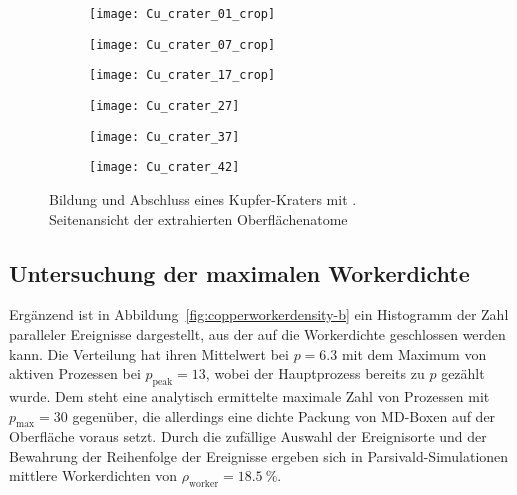 \begin{figure}

  \captionsetup[subfigure]{justification=centering,singlelinecheck=false}
  \def\subfigwidth{0.32\textwidth}

  \begin{subfigure}[t]{\subfigwidth}
    \texttt{[image: Cu\_crater\_01\_crop]}
  \end{subfigure}
  \hfill
  \begin{subfigure}[t]{\subfigwidth}
    \texttt{[image: Cu\_crater\_07\_crop]}
  \end{subfigure}
  \hfill
  \begin{subfigure}[t]{\subfigwidth}
    \texttt{[image: Cu\_crater\_17\_crop]}
  \end{subfigure}

  \begin{subfigure}[t]{\subfigwidth}
    \texttt{[image: Cu\_crater\_27]}
  \end{subfigure}
  \hfill
  \begin{subfigure}[t]{\subfigwidth}
    \texttt{[image: Cu\_crater\_37]}
  \end{subfigure}
  \hfill
  \begin{subfigure}[t]{\subfigwidth}
    \texttt{[image: Cu\_crater\_42]}
  \end{subfigure}

  \caption[Bildung und Abschluss eines Kupfer-Kraters]{
    Bildung und Abschluss eines Kupfer-Kraters mit .\\
    Seitenansicht der extrahierten Oberflächenatome
  }
  \label{fig:coppercrater}
\end{figure}

\subsection{Untersuchung der maximalen Workerdichte}

Ergänzend ist in Abbildung~\ref{fig:copperworkerdensity-b} ein Histogramm der Zahl paralleler Ereignisse dargestellt, aus der auf die Workerdichte geschlossen werden kann.
Die Verteilung hat ihren Mittelwert bei $p = \num{6.3}$ mit dem Maximum von aktiven Prozessen bei $p_\text{peak} = \num{13}$, wobei der Hauptprozess bereits zu $p$ gezählt wurde.
Dem steht eine analytisch ermittelte maximale Zahl von Prozessen mit $p_\text{max} = \num{30}$ gegenüber, die allerdings eine dichte Packung von MD-Boxen auf der Oberfläche voraus setzt.
Durch die zufällige Auswahl der Ereignisorte und der Bewahrung der Reihenfolge der Ereignisse ergeben sich in Parsivald-Simulationen mittlere Workerdichten von $\rho_\text{worker} = \SI{18.5}{\percent}$.

